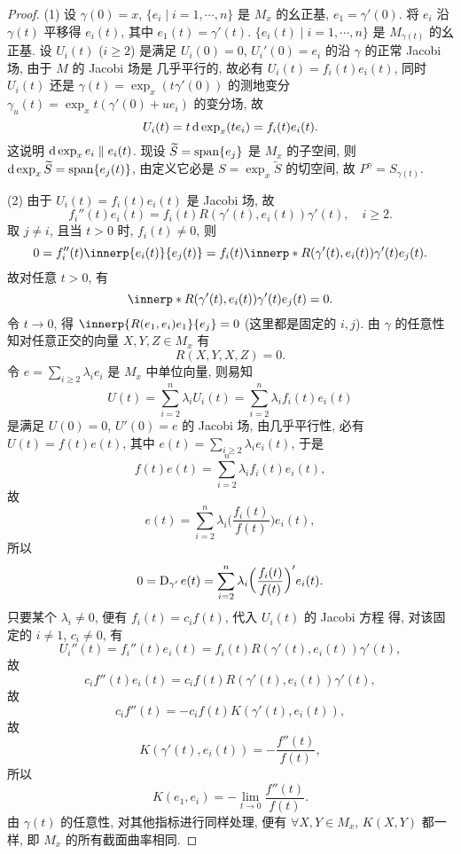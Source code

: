 \begin{proof}
  (1) 设 $\gamma(0)=x$, $\{e_i\mid i=1,\cdots,n\}$ 是 $M_x$ 的幺正基, $e_1=\gamma'(0)$.
  将 $e_i$ 沿 $\gamma(t)$ 平移得 $e_i(t)$, 其中 $e_1(t)=\gamma'(t)$.
  $\{e_i(t)\mid i=1,\cdots,n\}$ 是 $M_{\gamma(t)}$ 的幺正基. 设 $U_i(t)$ ($i\geq 2$)
  是满足 $U_i(0)=0$, $U_i'(0)=e_i$ 的沿 $\gamma$ 的正常 Jacobi 场, 由于 $M$ 的 Jacobi 场是
  几乎平行的, 故必有 $U_i(t)=f_i(t)e_i(t)$, 同时 $U_i(t)$ 还是 $\gamma(t)=\exp_x (t\gamma'(0))$
  的测地变分 $\gamma_u(t)=\exp_x t(\gamma'(0)+ue_i)$ 的变分场, 故
  \[U_i(t) = t\mathop{}\!\mathrm{d}\exp_x (te_i) = f_i(t)e_i(t).\]
  这说明 $\mathop{}\!\mathrm{d}\exp_x e_i\parallel e_i(t)$. 现设 $\widetilde{S}=\operatorname{span}\{e_j\}$
  是 $M_x$ 的子空间, 则 $\mathop{}\!\mathrm{d}\exp_x\widetilde{S}=\operatorname{span}\{e_j(t)\}$,
  由定义它必是 $S=\exp_x\widetilde{S}$ 的切空间, 故 $P^{\gamma}=S_{\gamma(t)}$.

  (2) 由于 $U_i(t) = f_i(t)e_i(t)$ 是 Jacobi 场, 故
  \[f_i''(t)e_i(t) = f_i(t)R(\gamma'(t),e_i(t))\gamma'(t),\quad i\geq 2.\]
  取 $j\neq i$, 且当 $t>0$ 时, $f_i(t)\neq 0$, 则
  \[0 = f_i''(t)\innerp{e_i(t)}{e_j(t)} =
    f_i(t)\innerp*{R(\gamma'(t),e_i(t))\gamma'(t)}{e_j(t)}.\]
  故对任意 $t>0$, 有
  \[\innerp*{R(\gamma'(t),e_i(t))\gamma'(t)}{e_j(t)} = 0.\]
  令 $t\to 0$, 得 $\innerp{R(e_1,e_i)e_1}{e_j}=0$ (这里都是固定的 $i,j$).
  由 $\gamma$ 的任意性知对任意正交的向量 $X,Y,Z\in M_x$ 有
  \[R(X,Y,X,Z)=0.\]
  令 $e=\sum_{i\geq 2} \lambda_i e_i$ 是 $M_x$ 中单位向量, 则易知
  \[U(t) = \sum_{i=2}^n \lambda_i U_i(t) = \sum_{i=2}^n \lambda_i f_i(t)e_i(t)\]
  是满足 $U(0)=0$, $U'(0)=e$ 的 Jacobi 场, 由几乎平行性, 必有 $U(t)=f(t)e(t)$,
  其中 $e(t)=\sum_{i\geq 2} \lambda_ie_i(t)$, 于是
  \[f(t)e(t) = \sum_{i=2}^n \lambda_i f_i(t)e_i(t),\]
  故
  \[e(t) = \sum_{i=2}^n \lambda_i\biggl(\frac{f_i(t)}{f(t)}\biggr)e_i(t),\]
  所以
  \[0 = \operatorname{D}_{\gamma'}e(t) = \sum_{i=2}^n \lambda_i
    \biggl(\frac{f_i(t)}{f(t)}\biggr)'e_i(t).\]
  只要某个 $\lambda_i\neq 0$, 便有 $f_i(t)=c_if(t)$, 代入 $U_i(t)$ 的 Jacobi 方程
  得, 对该固定的 $i\neq 1$, $c_i\neq 0$, 有
  \[U_i''(t) = f_i''(t)e_i(t) = f_i(t)R(\gamma'(t),e_i(t))\gamma'(t),\]
  故
  \[c_i f''(t)e_i(t) = c_i f(t)R(\gamma'(t),e_i(t))\gamma'(t),\]
  故
  \[c_i f''(t) = -c_i f(t)K(\gamma'(t),e_i(t)),\]
  故
  \[K(\gamma'(t),e_i(t)) = -\frac{f''(t)}{f(t)},\]
  所以
  \[K(e_1,e_i) = -\lim_{t\to 0}\frac{f''(t)}{f(t)}.\]
  由 $\gamma(t)$ 的任意性, 对其他指标进行同样处理, 便有
  $\forall X,Y\in M_x$, $K(X,Y)$ 都一样, 即 $M_x$ 的所有截面曲率相同.


\end{proof}
